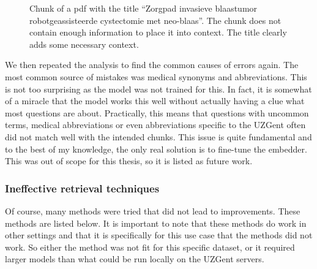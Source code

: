 \begin{figure}[h]
    \centerline{}
    \caption{Chunk of a pdf with the title ``Zorgpad invasieve blaastumor robotgeassisteerde cystectomie met neo-blaas''. The chunk does not contain enough information to place it into context. The title clearly adds some necessary context.}
    \label{fig:out_of_context_zenya_doc}
\end{figure}

We then repeated the analysis to find the common causes of errors again. The most common source of mistakes was medical synonyms and abbreviations. This is not too surprising as the model was not trained for this. In fact, it is somewhat of a miracle that the model works this well without actually having a clue what most questions are about. Practically, this means that questions with uncommon terms, medical abbreviations or even abbreviations specific to the UZGent often did not match well with the intended chunks. This issue is quite fundamental and to the best of my knowledge, the only real solution is to fine-tune the embedder. This was out of scope for this thesis, so it is listed as future work.

\subsubsection{Ineffective retrieval techniques}
Of course, many methods were tried that did not lead to improvements. These methods are listed below. It is important to note that these methods do work in other settings and that it is specifically for this use case that the methods did not work. So either the method was not fit for this specific dataset, or it required larger models than what could be run locally on the UZGent servers.

\FloatBarrier

